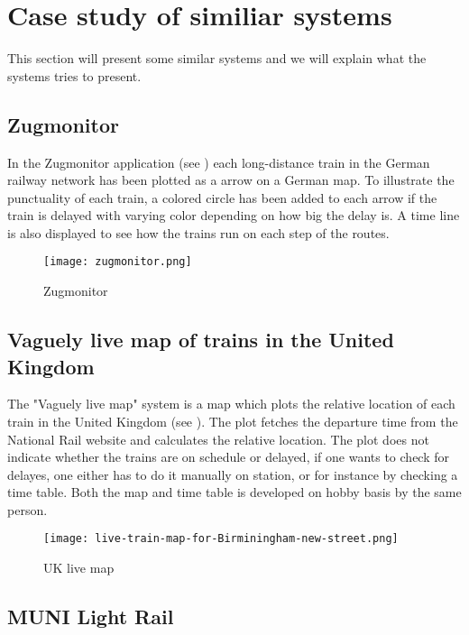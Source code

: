 \section{Case study of similiar systems}
\label{sect:backgroundExamples}
This section will present some similar systems and we will explain what the
systems tries to present.
\subsection{Zugmonitor}
\label{sub:subsection_zugmonitor}

In the Zugmonitor application (see ) each long-distance 
train in the German railway network has been plotted as a arrow on a German 
map. To illustrate the punctuality of each train, a colored circle has been 
added to each arrow if the train is delayed with varying color depending on 
how big the delay is. A time line is also displayed to see how the trains run 
on each step of the routes. 

\begin{figure}[!htbp]
	\texttt{[image: zugmonitor.png]}
	\caption[Zugmonitor]{Zugmonitor \cite{zugmonitor}}
	\label{fig:zugmonitor}
\end{figure}

\subsection{Vaguely live map of trains in the United Kingdom}
\label{sub:subsection_ukLiveMap}

The "Vaguely live map" system is a map which plots the relative location of 
each train in the United Kingdom (see ). The plot fetches 
the departure time from the  National Rail website and calculates the relative 
location. The plot does not indicate whether the trains are on schedule or 
delayed, if one wants to check for delayes, one either has to do it manually 
on station, or for instance by checking a time table\cite{trainTimesUK}. Both 
the map and time table is developed on hobby basis by the same person. 

\begin{figure}[!htbp]
	\texttt{[image: live-train-map-for-Birminingham-new-street.png]}
	\caption[UK live map]{UK live map \cite{ukLiveMap}}
	\label{fig:ukLiveMap}
\end{figure}

\subsection{MUNI Light Rail}
\label{sub:subsection_muniLightRail}

